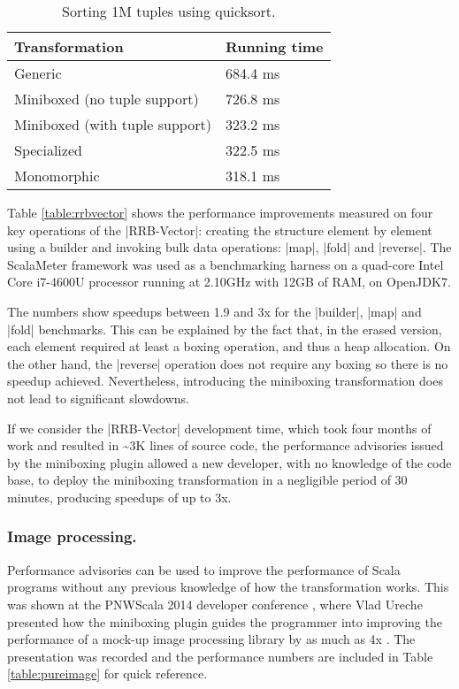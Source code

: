 \begin{table}[t]
  \begin{tabularx}{0.48\textwidth}{|g *{1}{|Y}|} \hline
    \textbf{Transformation} & \textbf{Running time}  \\ \hline
    Generic                        &              684.4 ms  \\
    Miniboxed (no tuple support)   &              726.8 ms  \\
    Miniboxed (with tuple support) &              323.2 ms  \\
    Specialized                    &              322.5 ms  \\
    Monomorphic                    &              318.1 ms  \\ \hline
  \end{tabularx}

  \caption{Sorting 1M tuples using quicksort.}
  \label{table:tuple}

\end{table}


Table \ref{table:rrbvector} shows the performance improvements measured on four key operations of the |RRB-Vector|: creating the structure element by element using a builder and invoking bulk data operations: |map|, |fold| and |reverse|. The ScalaMeter framework \cite{scalameter} was used as a benchmarking harness on a quad-core Intel Core i7-4600U processor running at 2.10GHz with 12GB of RAM, on OpenJDK7. %

The numbers show speedups between 1.9 and 3x for the |builder|, |map| and |fold| benchmarks. This can be explained by the fact that, in the erased version, each element required at least a boxing operation, and thus a heap allocation. On the other hand, the |reverse| operation does not require any boxing so there is no speedup achieved. Nevertheless, introducing the miniboxing transformation does not lead to significant slowdowns.

If we consider the |RRB-Vector| development time, which took four months of work and resulted in \textasciitilde3K lines of source code, the performance advisories issued by the miniboxing plugin allowed a new developer, with no knowledge of the code base, to deploy the miniboxing transformation in a negligible period of 30 minutes, producing speedups of up to 3x.



\subsubsection*{Image processing.} Performance advisories can be used to improve the performance of Scala programs without any previous knowledge of how the transformation works. This was shown at the PNWScala 2014 developer conference \cite{pnwscala-conf}, where Vlad Ureche presented how the miniboxing plugin guides the programmer into improving the performance of a mock-up image processing library by as much as 4x \cite{pnwscala-pureimage}. The presentation was recorded and the performance numbers are included in Table \ref{table:pureimage} for quick reference.



